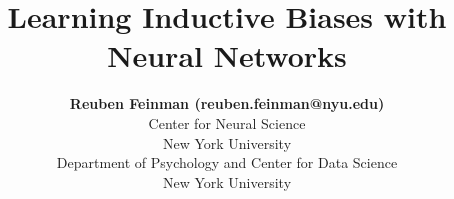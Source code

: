 \documentclass[10pt,letterpaper]{article}
\title{Learning Inductive Biases with Neural Networks}
\author{{\large \bf Reuben Feinman (reuben.feinman@nyu.edu)} \\
  Center for Neural Science \\
  New York University
  \AND {\large \bf Brenden M. Lake (brenden@nyu.edu)} \\
  Department of Psychology and Center for Data Science \\
  New York University}
\begin{document}
\maketitle


\begin{abstract}
    
\end{abstract}





\nocite{Ritter2017}




\setlength{\bibleftmargin}{.125in}
\setlength{\bibindent}{-\bibleftmargin}


\end{document}
